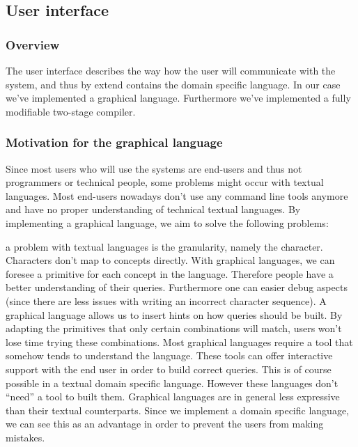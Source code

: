 
\subsection{User interface}
\subsubsection{Overview}
The user interface describes the way how the user will communicate with the
system, and thus by extend contains the domain specific language. In our case
we've implemented a graphical language. Furthermore we've implemented a fully
modifiable two-stage compiler.
\subsubsection{Motivation for the graphical language}
Since most users who will use the systems are end-users and thus not
programmers or technical people, some problems might occur with textual
languages. Most end-users nowadays don't use any command line tools anymore and
have no proper understanding of technical textual languages. By implementing a
graphical language, we aim to solve the following problems:
\begin{itemize}
  a problem with textual languages is
the granularity, namely the character. Characters don't map to concepts
directly. With graphical languages, we can foresee a primitive for each concept
in the language. Therefore people have a better understanding of their queries.
Furthermore one can easier debug aspects (since there are less issues with
writing an incorrect character sequence).
  A graphical language allows us to insert
hints on how queries should be built. By adapting the primitives that only
certain combinations will match, users won't lose time trying these
combinations.
Most graphical languages require a tool that somehow
tends to understand the language. These tools can offer interactive support
with the end user in order to build correct queries. This is of course possible
in a textual domain specific language. However these languages don't ``need''
a tool to built them.
Graphical languages are in general less
expressive than their textual counterparts. Since we implement a domain
specific language, we can see this as an advantage in order to prevent the
users from making mistakes.
\end{itemize}

